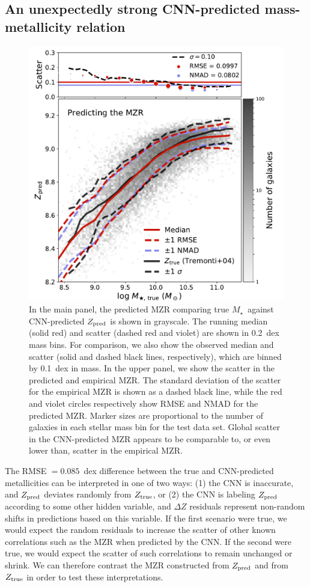 \documentclass[fleqn,usenatbib]{mnras}
\newcommand{\mstar}{\hbox{$M_{\star}$}}
\begin{document}
\subsection{An unexpectedly strong CNN-predicted mass-metallicity relation}
\begin{figure}
	\includegraphics[width=\columnwidth]{06-mzr.pdf}
	\caption{\label{fig:mzr}
		In the main panel, the predicted MZR comparing true \mstar\ against CNN-predicted $Z_{\rm pred}$ is shown in grayscale. The running median (solid red) and scatter (dashed red and violet) are shown in 0.2~dex mass bins. For comparison, we also show the \citet{Tremonti2004} observed median and scatter (solid and dashed black lines, respectively), which are binned by 0.1~dex in mass. In the upper panel, we show the scatter in the predicted and empirical MZR. The standard deviation of the scatter for the empirical MZR is shown as a dashed black line, while the red and violet circles respectively show RMSE and NMAD for the predicted MZR. Marker sizes are proportional to the number of galaxies in each stellar mass bin for the test data set. Global scatter in the CNN-predicted MZR appears to be comparable to, or even lower than, scatter in the empirical MZR.}
\end{figure}

The RMSE $= 0.085$~dex difference between the true and CNN-predicted metallicities can be interpreted in one of two ways: (1) the CNN is inaccurate, and $Z_{\rm pred}$ deviates randomly from $Z_{\rm true}$, or (2) the CNN is labeling $Z_{\rm pred}$ according to some other hidden variable, and $\Delta Z$ residuals represent non-random shifts in predictions based on this variable. If the first scenario were true, we would expect the random residuals to increase the scatter of other known correlations such as the MZR when predicted by the CNN. If the second were true, we would expect the scatter of such correlations to remain unchanged or shrink. We can therefore contrast the MZR constructed from $Z_{\rm pred}$ and from $Z_{\rm true}$ in order to test these interpretations.
\end{document}
